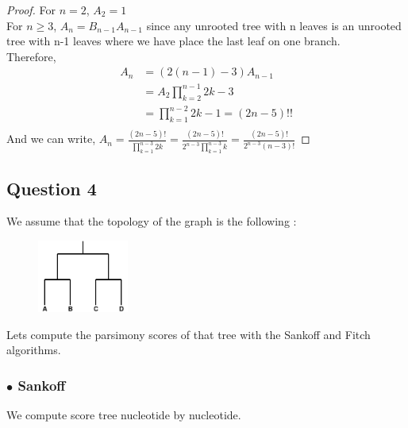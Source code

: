 \documentclass[]{article}
\theoremstyle{definition}
\begin{document}
\begin{proof}For $n=2$, $A_{2} = 1$\\
For $n\geq 3$, $A_{n} = B_{n-1}A_{n-1}$ since any unrooted tree with n leaves is an unrooted tree with n-1 leaves where we have place the last leaf on one branch.\\
Therefore, 
\begin{align*}
A_{n} &= (2(n-1)-3)A_{n-1}\\
&= A_{2}{\displaystyle{\prod_{k=2}^{n-1} 2k - 3}}\\
&= {\displaystyle \prod_{k=1}^{n-2} 2k - 1} = (2n-5)!!\\
\end{align*}
And we can write,
$
A_{n} = \frac{(2n - 5)!}{\displaystyle \prod_{k=1}^{n-3} 2k}
=  \frac{(2n - 5)!}{2^{n-3}\displaystyle \prod_{k=1}^{n-3}k}
= \frac{(2n - 5)!}{2^{n-3}(n-3)!}
$
\end{proof}
\newpage
\subsection{Question 4}
We assume that the topology of the graph is the following :

\begin{figure}[h!]
	\centering
	\includegraphics*[width = 3cm]{image/topology.png}
\end{figure}

Lets compute the parsimony scores of that tree with the Sankoff and Fitch algorithms.

\subsubsection*{$\bullet$ Sankoff }
We compute score tree nucleotide by nucleotide.
\end{document}
